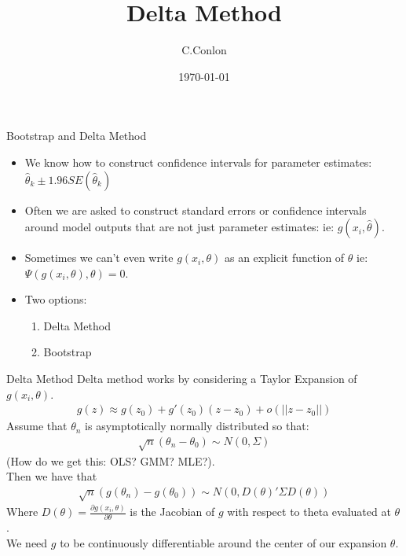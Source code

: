 \documentclass[aspectratio=169]{beamer}
\title [Bootstrap]{Delta Method}
\author{C.Conlon}
\institute{Applied Econometrics II}
\date{\today}
\begin{document}
\begin{frame}
\titlepage
\end{frame}


\begin{frame}{Bootstrap and Delta Method}
\begin{itemize}
\item We know how to construct confidence intervals for parameter estimates:  $\hat{\theta}_k \pm 1.96 SE(\hat{\theta}_k)$
\item Often we are asked to construct standard errors or confidence intervals around model outputs that are not just parameter estimates: ie:  $g(x_i,\hat{\theta})$.
\item Sometimes we can't even write $g(x_i,\theta)$ as an explicit function of $\theta$ ie: $\Psi(g(x_i,\theta),\theta) = 0$.
\item Two options:
\begin{enumerate}
\item Delta Method
\item Bootstrap
\end{enumerate}
\end{itemize}
\end{frame}

\begin{frame}{Delta Method}
Delta method works by considering a \alert{Taylor Expansion} of $g(x_i,\theta)$.
\begin{eqnarray*}
g(z) \approx g(z_0) + g'(z_0)(z-z_0) + o(||z-z_0||)
\end{eqnarray*}
Assume that $\theta_n$ is asymptotically normally distributed so that:
\begin{eqnarray*}
\sqrt{n} (\theta_n - \theta_0) \sim N(0,\Sigma)
\end{eqnarray*}
(How do we get this: OLS? GMM? MLE?).\\

Then we have that 
\begin{eqnarray*}
\sqrt{n} (g(\theta_n) - g(\theta_0)) \sim N(0,D(\theta)' \Sigma  D(\theta))
\end{eqnarray*}
Where $D(\theta) = \frac{\partial g(x_i, \theta)}{\partial \theta}$ is the Jacobian of $g$ with respect to theta evaluated at $\theta$.\\
We need $g$ to be continuously differentiable around the center of our expansion $\theta$.
\end{frame}
\end{document}
